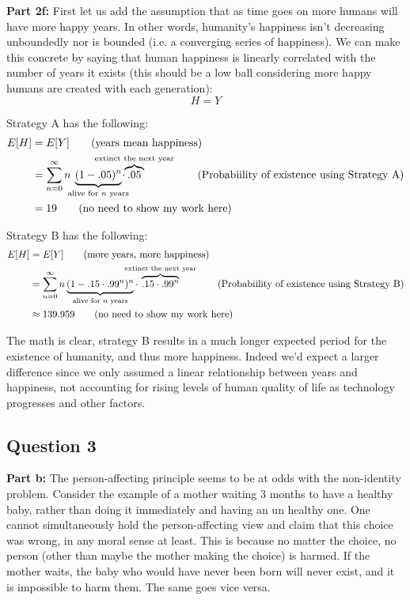 \documentclass{article}
\begin{document}
\noindent\textbf{Part 2f:} First let us add the assumption that as time goes on more humans will have more happy years. In other words, humanity's happiness isn't decreasing unboundedly nor is bounded (i.e. a converging series of happiness). We can make this concrete by saying that human happiness is linearly correlated with the number of years it exists (this should be a low ball considering more happy humans are created with each generation):
$$H=Y$$

Strategy A has the following:
\begin{align*}
    E[H]&=E[Y]\tag{years mean happiness}\\
    &=\sum_{n=0}^\infty n\mkern-8mu\underbrace{(1-.05)^n}_{\text{alive for $n$ years}}\mkern-14mu\cdot\mkern-54mu\overbrace{.05}^{\text{extinct the next year}}\tag{Probabiility of existence using Strategy A}\\
    &=19\tag{no need to show my work here}
\end{align*}

Strategy B has the following:
\begin{align*}
    E[H]&=E[Y]\tag{more years, more happiness}\\
    &=\sum_{n=0}^\infty n\underbrace{(1-.15\cdot.99^n)^n}_{\text{alive for $n$ years}}\cdot\mkern-28mu\overbrace{.15\cdot.99^n}^{\text{extinct the next year}}\tag{Probabiility of existence using Strategy B}\\
    &\approx139.959\tag{no need to show my work here}
\end{align*}

The math is clear, strategy B results in a much longer expected period for the existence of humanity, and thus more happiness. Indeed we'd expect a larger difference since we only assumed a linear relationship between years and happiness, not accounting for rising levels of human quality of life as technology progresses and other factors.

\subsection*{Question 3}

\noindent\textbf{Part b:} The person-affecting principle seems to be at odds with the non-identity problem. Consider the example of a mother waiting 3 months to have a healthy baby, rather than doing it immediately and having an un healthy one. One cannot simultaneously hold the person-affecting view and claim that this choice was wrong, in any moral sense at least. This is because no matter the choice, no person (other than maybe the mother making the choice) is harmed. If the mother waits, the baby who would have never been born will never exist, and it is impossible to harm them. The same goes vice versa.
\bigskip
\end{document}
